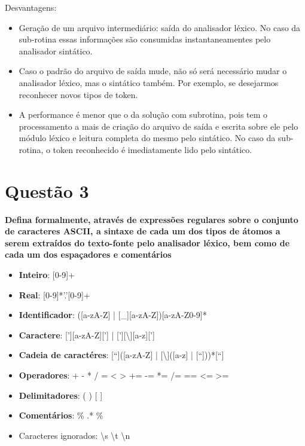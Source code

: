 Desvantagens:
\begin{itemize}
	\item Geração de um arquivo intermediário: saída do analisador léxico. No caso da sub-rotina essas informações são consumidas instantaneamentes pelo analisador sintático.
	\item Caso o padrão do arquivo de saída mude, não só será necessário mudar o analisador léxico, mas o sintático também. Por exemplo, se desejarmos reconhecer novos tipos de token.
	\item A performance é menor que o da solução com subrotina, pois tem o processamento a mais de criação do arquivo de saída e escrita sobre ele pelo módulo léxico e leitura completa do mesmo pelo sintático. No caso da sub-rotina, o token reconhecido é imediatamente lido pelo sintático.
\end{itemize}


\section{Questão 3}

\textbf{Defina formalmente, através de expressões regulares sobre o conjunto de caracteres ASCII, a sintaxe de cada um dos tipos de átomos a serem extraídos do texto-fonte pelo analisador léxico, bem como de cada um dos espaçadores e comentários}

\begin{itemize}
	\item \textbf{Inteiro}: [0-9]+

	\item \textbf{Real}: [0-9]*'.'[0-9]+

	\item \textbf{Identificador}: ([a-zA-Z] | [\_][a-zA-Z])[a-zA-Z0-9]*

	\item \textbf{Caractere}: ['][a-zA-Z]['] | ['][\textbackslash ][a-z][']

	\item \textbf{Cadeia de caractéres}: [“]([a-zA-Z] | [\textbackslash ]([a-z] | [“]))*[“]

	\item \textbf{Operadores}: + - * / = < > += -= *= /= == <= >=

	\item \textbf{Delimitadores}: ( ) { } [ ]

	\item \textbf{Comentários}: \% .* \%

	\item Caracteres ignorados: \textbackslash s \textbackslash t \textbackslash n
\end{itemize}

